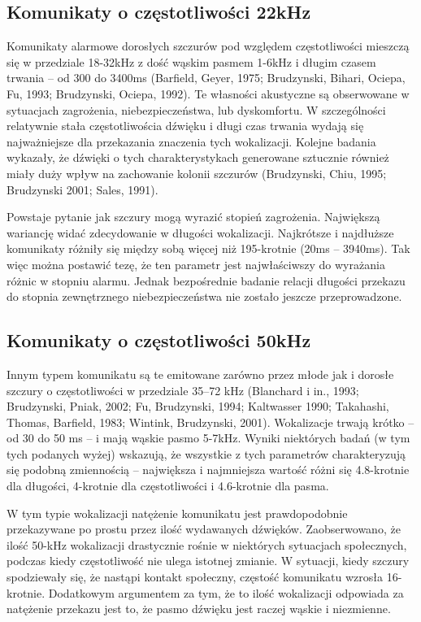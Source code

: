 \documentclass{psychol}
\begin{document}
\subsection{Komunikaty o częstotliwości 22kHz}

Komunikaty alarmowe dorosłych szczurów pod względem częstotliwości mieszczą się w przedziale 18-32kHz z dość wąskim pasmem 1-6kHz i długim czasem trwania -- od 300 do 3400ms (Barfield, Geyer, 1975; Brudzynski, Bihari, Ociepa, Fu, 1993; Brudzynski, Ociepa, 1992). Te własności akustyczne są obserwowane w sytuacjach zagrożenia, niebezpieczeństwa, lub dyskomfortu. W szczególności relatywnie stała częstotliwościa dźwięku i długi czas trwania wydają się najważniejsze dla przekazania znaczenia tych wokalizacji. Kolejne badania wykazały, że dźwięki o tych charakterystykach generowane sztucznie również miały duży wpływ na zachowanie kolonii szczurów (Brudzynski, Chiu, 1995; Brudzynski 2001; Sales, 1991).

Powstaje pytanie jak szczury mogą wyrazić stopień zagrożenia. Największą wariancję widać zdecydowanie w długości wokalizacji. Najkrótsze i najdłuższe komunikaty różniły się między sobą więcej niż 195-krotnie (20ms -- 3940ms). Tak więc można postawić tezę, że ten parametr jest najwłaściwszy do wyrażania różnic w stopniu alarmu. Jednak bezpośrednie badanie relacji długości przekazu do stopnia zewnętrznego niebezpieczeństwa nie zostało jeszcze przeprowadzone. 

\subsection{Komunikaty o częstotliwości 50kHz}

Innym typem komunikatu są te emitowane zarówno przez młode jak i dorosłe szczury o częstotliwości w przedziale 35–72 kHz (Blanchard i in., 1993; Brudzynski, Pniak, 2002; Fu, Brudzynski, 1994; Kaltwasser 1990; Takahashi, Thomas, Barfield, 1983; Wintink, Brudzynski, 2001). Wokalizacje trwają krótko -- od 30 do 50 ms -- i mają wąskie pasmo 5-7kHz. Wyniki niektórych badań (w tym tych podanych wyżej) wskazują, że wszystkie z tych parametrów charakteryzują się podobną zmiennością -- największa i najmniejsza wartość różni się 4.8-krotnie dla długości, 4-krotnie dla częstotliwości i 4.6-krotnie dla pasma.

W tym typie wokalizacji natężenie komunikatu jest prawdopodobnie przekazywane po prostu przez ilość wydawanych dźwięków. Zaobserwowano, że ilość 50-kHz wokalizacji drastycznie rośnie w niektórych sytuacjach społecznych, podczas kiedy częstotliwość nie ulega istotnej zmianie. W sytuacji, kiedy szczury spodziewały się, że nastąpi kontakt społeczny, częstość komunikatu wzrosła 16-krotnie. Dodatkowym argumentem za tym, że to ilość wokalizacji odpowiada za natężenie przekazu jest to, że pasmo dźwięku jest raczej wąskie i niezmienne.
\end{document}
